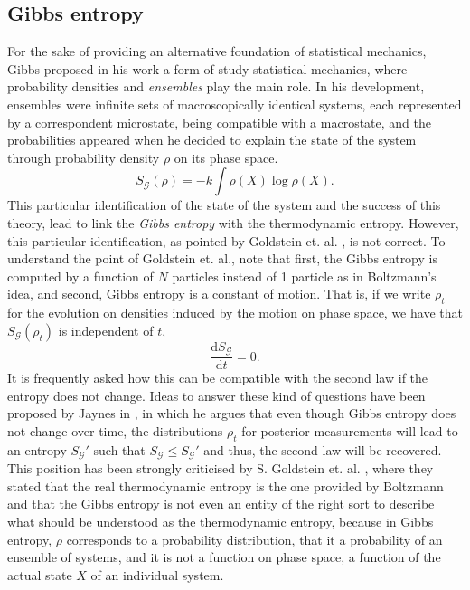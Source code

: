 \subsection{Gibbs entropy}
For the sake of providing an alternative foundation of statistical mechanics, Gibbs proposed in his work \cite{gibbs_elementary_1902} a form of study statistical mechanics, where probability densities and \textit{ensembles} play the main role. In his development, ensembles were infinite sets of macroscopically identical systems, each represented by a correspondent microstate, being compatible with a macrostate, and the probabilities appeared when he decided to explain the state of the system through probability density $\rho$ on its phase space.
\begin{equation}
S_{\mathcal{G}} (\rho) =-k \int \rho(X) \log\rho(X).
\label{CH1:gibbs_entropy}
\end{equation}
This particular identification of the state of the system and the success of this theory, lead to link the \textit{Gibbs entropy} with the thermodynamic entropy. However, this particular identification, as pointed by Goldstein et. al. \cite{goldstein_boltzmanns_2001, goldstein_gibbs_2020}, is not correct. To understand the point of Goldstein et. al., note that first, the Gibbs entropy is computed by a function of $N$ particles instead of 1 particle as in Boltzmann's idea, and second, Gibbs entropy is a constant of motion. That is, if we write $\rho_t$ for the evolution on densities induced by the motion on phase space, we have that $S_{\mathcal{G}} (\rho_t)$ is independent of $t$, 
\begin{equation}
\frac{\mathrm{d} S_{\mathcal{G}}}{\mathrm{d} t} =0.
\end{equation}
It is frequently asked how this can be compatible with the second law if the entropy does not change. Ideas to answer these kind of questions have been proposed by Jaynes in \cite{doi:10.1119/1.1971557}, in which he argues that even though Gibbs entropy does not change over time, the distributions $\rho_t$ for posterior measurements will lead to an entropy $S_{\mathcal{G}}'$  such that $S_{\mathcal{G}}\leq S_{\mathcal{G}}'$ and thus, the second law will be recovered.
This position has been strongly criticised by S. Goldstein et. al. \cite{goldstein_boltzmanns_2001, goldstein_gibbs_2020}, where they stated that the real thermodynamic entropy is the one provided by Boltzmann and that the Gibbs entropy is not even an entity of the right sort to describe what should be understood as the thermodynamic entropy, because in Gibbs entropy,  $\rho$ corresponds to a probability distribution, that it a probability of an ensemble of systems, and it is not a function on phase space, a function of the actual state $X$ of an individual system. \\
